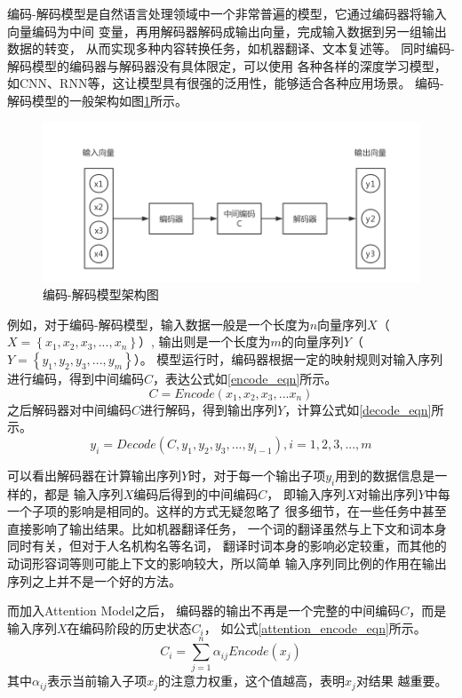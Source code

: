 编码-解码模型是自然语言处理领域中一个非常普遍的模型，它通过编码器将输入向量编码为中间
变量，再用解码器解码成输出向量，完成输入数据到另一组输出数据的转变，
从而实现多种内容转换任务，如机器翻译、文本复述等。
同时编码-解码模型的编码器与解码器没有具体限定，可以使用
各种各样的深度学习模型，如CNN、RNN等，这让模型具有很强的泛用性，能够适合各种应用场景。
编码-解码模型的一般架构如图\ref{Encoder}所示。
\begin{figure}[h]
    \includegraphics[scale=0.5]{picture/Encoder.png}
    \caption{编码-解码模型架构图}
    \label{Encoder}
\end{figure}
\fi

例如，对于编码-解码模型，输入数据一般是一个长度为$n$向量序列$X$（$X= \left \{x_1,x_2,x_3,...,x_n \right \}$）,
输出则是一个长度为$m$的向量序列$Y$（$Y= \left \{y_1,y_2,y_3,...,y_m \right \}$）。
模型运行时，编码器根据一定的映射规则对输入序列进行编码，得到中间编码$C$，表达公式如\ref{encode_eqn}所示。
\begin{equation}
    C=Encode\left ( x_1,x_2,x_3,...x_n \right )
    \label{encode_eqn}
\end{equation}
之后解码器对中间编码$C$进行解码，得到输出序列$Y$，计算公式如\ref{decode_eqn}所示。
\begin{equation}
    y_i=Decode\left ( C,y_1,y_2,y_3,...,y_{i-1} \right ),i=1,2,3,...,m
    \label{decode_eqn}
\end{equation}

可以看出解码器在计算输出序列$Y$时，对于每一个输出子项$y_i$用到的数据信息是一样的，都是
输入序列$X$编码后得到的中间编码$C$，
即输入序列$X$对输出序列$Y$中每一个子项的影响是相同的。这样的方式无疑忽略了
很多细节，在一些任务中甚至直接影响了输出结果。比如机器翻译任务，
一个词的翻译虽然与上下文和词本身同时有关，但对于人名机构名等名词，
翻译时词本身的影响必定较重，而其他的动词形容词等则可能上下文的影响较大，所以简单
输入序列同比例的作用在输出序列之上并不是一个好的方法。

而加入Attention Model之后，
编码器的输出不再是一个完整的中间编码$C$，而是输入序列$X$在编码阶段的历史状态$C_i$，
如公式\ref{attention_encode_eqn}所示。
\begin{equation}
    C_i=\sum_{j=1}^{n}\alpha_{ij}Encode\left ( x_j \right )
    \label{attention_encode_eqn}
\end{equation}
其中$\alpha_{ij}$表示当前输入子项$x_j$的注意力权重，这个值越高，表明$x_j$对结果
越重要。

